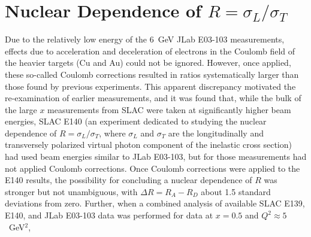 \section{Nuclear Dependence of $R=\sigma_L/\sigma_T$}
\label{sec:long}

Due to the relatively low energy of the 6~GeV JLab E03-103 measurements, effects due to acceleration and
deceleration of electrons in the Coulomb field of the heavier targets (Cu and Au) could not be ignored.
However, once applied, these so-called Coulomb corrections resulted in ratios systematically larger
than those found by previous experiments.  This apparent discrepancy motivated the re-examination of
earlier measurements, and it was found that, while the bulk of the large $x$ measurements from SLAC
were taken at significantly higher beam energies, SLAC E140 (an experiment dedicated to studying
the nuclear dependence of $R=\sigma_L/\sigma_T$, where $\sigma_L$ and $\sigma_T$ are the longitudinally and transversely polarized virtual photon component of the inelastic cross section) had used beam energies similar to JLab E03-103, but for
those measurements had not applied Coulomb corrections.  Once Coulomb corrections were applied to the E140
results, the possibility for concluding a nuclear dependence of $R$ was stronger but not unambiguous, with
$\Delta R=R_A-R_D$ about 1.5 standard deviations from zero. Further, when a combined analysis
of available SLAC E139, E140, and JLab E03-103 data was performed for data at $x=0.5$ and $Q^2\approx5$~GeV$^2$,

